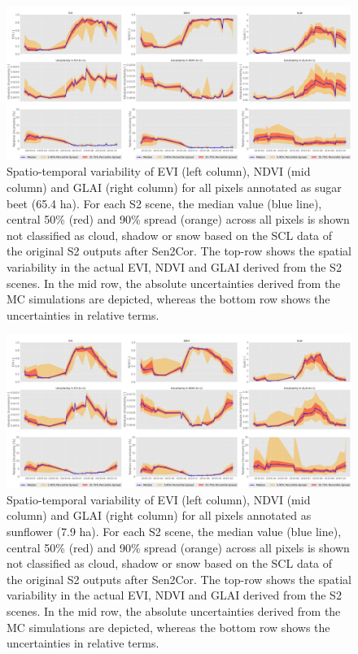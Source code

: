 \begin{figure}[H]
    \centering
    \includegraphics[width=\textwidth]{04-Uncertainty/img/Sugar Beet_all-pixels-uncertainty-timeseries.png}
    \caption{Spatio-temporal variability of EVI (left column), NDVI (mid column) and GLAI (right column) for all pixels annotated as sugar beet (65.4 ha). For each S2 scene, the median value (blue line), central 50\% (red) and 90\% spread (orange) across all pixels is shown not classified as cloud, shadow or snow based on the SCL data of the original S2 outputs after Sen2Cor. The top-row shows the spatial variability in the actual EVI, NDVI and GLAI derived from the S2 scenes. In the mid row, the absolute uncertainties derived from the MC simulations are depicted, whereas the bottom row shows the uncertainties in relative terms.}
    \label{fig:sugar-beet-timeseries-and-uncertainty}
\end{figure}

\begin{figure}[H]
    \centering
    \includegraphics[width=\textwidth]{04-Uncertainty/img/Sunflower_all-pixels-uncertainty-timeseries.png}
    \caption{Spatio-temporal variability of EVI (left column), NDVI (mid column) and GLAI (right column) for all pixels annotated as sunflower (7.9 ha). For each S2 scene, the median value (blue line), central 50\% (red) and 90\% spread (orange) across all pixels is shown not classified as cloud, shadow or snow based on the SCL data of the original S2 outputs after Sen2Cor. The top-row shows the spatial variability in the actual EVI, NDVI and GLAI derived from the S2 scenes. In the mid row, the absolute uncertainties derived from the MC simulations are depicted, whereas the bottom row shows the uncertainties in relative terms.}
    \label{fig:sunflower-timeseries-and-uncertainty}
\end{figure}

